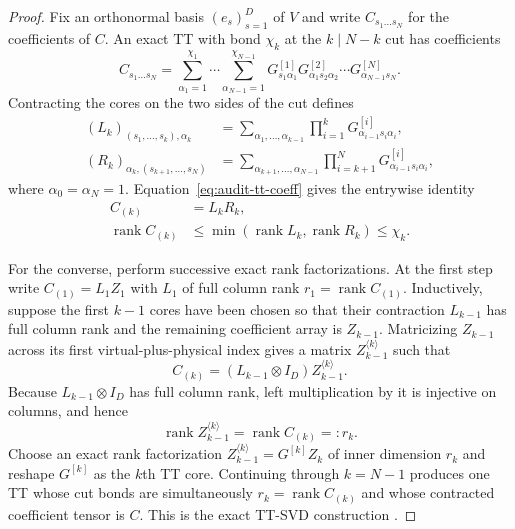 \documentclass[aps,pra,reprint,superscriptaddress,nofootinbib,longbibliography,showkeys]{revtex4-2}
\theoremstyle{definition}
\newcommand{\rank}{\operatorname{rank}}
\begin{document}
\begin{proof}
Fix an orthonormal basis $(e_s)_{s=1}^D$ of $V$ and write
$C_{s_1\ldots s_N}$ for the coefficients of $C$.  An exact TT with bond
$\chi_k$ at the $k\mid N-k$ cut has coefficients
\begin{equation}
C_{s_1\ldots s_N}=
\sum_{\alpha_1=1}^{\chi_1}\cdots
\sum_{\alpha_{N-1}=1}^{\chi_{N-1}}
G^{[1]}_{s_1\alpha_1}G^{[2]}_{\alpha_1s_2\alpha_2}
\cdots G^{[N]}_{\alpha_{N-1}s_N}.
\label{eq:audit-tt-coeff}
\end{equation}
Contracting the cores on the two sides of the cut defines
\begin{align}
(L_k)_{(s_1,\ldots,s_k),\alpha_k}
 &=\sum_{\alpha_1,\ldots,\alpha_{k-1}}
   \prod_{i=1}^{k}G^{[i]}_{\alpha_{i-1}s_i\alpha_i},\nonumber\\
(R_k)_{\alpha_k,(s_{k+1},\ldots,s_N)}
 &=\sum_{\alpha_{k+1},\ldots,\alpha_{N-1}}
   \prod_{i=k+1}^{N}G^{[i]}_{\alpha_{i-1}s_i\alpha_i},
\end{align}
where $\alpha_0=\alpha_N=1$.  Equation~\eqref{eq:audit-tt-coeff} gives the
entrywise identity
\begin{align}
C_{(k)}&=L_kR_k,\nonumber\\
\rank C_{(k)}&\le\min(\rank L_k,\rank R_k)\le\chi_k.
\label{eq:audit-tt-lower}
\end{align}

For the converse, perform successive exact rank factorizations.  At the first
step write $C_{(1)}=L_1Z_1$ with $L_1$ of full column rank
$r_1=\rank C_{(1)}$.  Inductively, suppose the first $k-1$ cores have been
chosen so that their contraction $L_{k-1}$ has full column rank and the
remaining coefficient array is $Z_{k-1}$.  Matricizing $Z_{k-1}$ across its
first virtual-plus-physical index gives a matrix $Z_{k-1}^{\langle k\rangle}$
such that
\begin{equation}
C_{(k)}=(L_{k-1}\otimes I_D)Z_{k-1}^{\langle k\rangle}.
\end{equation}
Because $L_{k-1}\otimes I_D$ has full column rank, left multiplication by it
is injective on columns, and hence
\begin{equation}
\rank Z_{k-1}^{\langle k\rangle}=\rank C_{(k)}=:r_k.
\end{equation}
Choose an exact rank factorization
$Z_{k-1}^{\langle k\rangle}=G^{[k]}Z_k$ of inner dimension $r_k$ and reshape
$G^{[k]}$ as the $k$th TT core.  Continuing through $k=N-1$ produces one TT
whose cut bonds are simultaneously $r_k=\rank C_{(k)}$ and whose contracted
coefficient tensor is $C$.  This is the exact TT-SVD construction
\cite{Oseledets2011TT}.
\end{proof}
\end{document}
